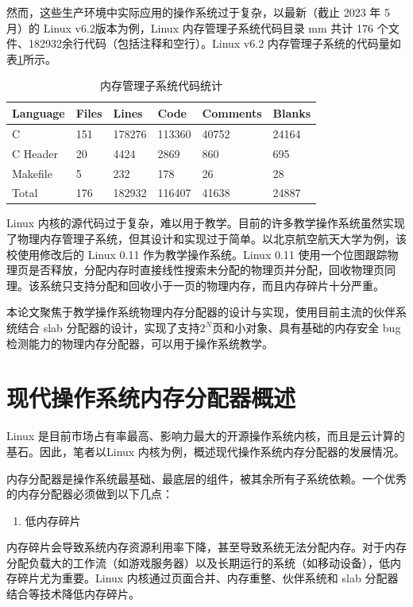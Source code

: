 \documentclass[AutoFakeBold]{LZUThesis}
\newcommand{\tightlist}{%
  \setlength{\itemsep}{0pt}\setlength{\parskip}{0pt}}
\begin{document}
\begin{sloppypar}
然而，这些生产环境中实际应用的操作系统过于复杂，以最新（截止 2023 年 5 月）的 Linux v6.2版本为例，Linux 内存管理子系统代码目录 mm 共计 176 个文件、182932余行代码（包括注释和空行）。Linux v6.2 内存管理子系统的代码量如表\ref{table:mm-code-stastic}所示。

\begin{longtable}[htb]{@{}llllll@{}}
\caption{内存管理子系统代码统计}\label{table:mm-code-stastic} \\
\toprule\noalign{}
Language & Files & Lines & Code & Comments & Blanks \\
\midrule\noalign{}
\endhead
\bottomrule\noalign{}
\endlastfoot
C & 151 & 178276 & 113360 & 40752 & 24164 \\
C Header & 20 & 4424 & 2869 & 860 & 695 \\
Makefile & 5 & 232 & 178 & 26 & 28 \\
Total & 176 & 182932 & 116407 & 41638 & 24887 \\
\end{longtable}

Linux 内核的源代码过于复杂，难以用于教学。目前的许多教学操作系统虽然实现了物理内存管理子系统，但其设计和实现过于简单。以北京航空航天大学为例，该校使用修改后的 Linux 0.11 作为教学操作系统。Linux 0.11 使用一个位图跟踪物理页是否释放，分配内存时直接线性搜索未分配的物理页并分配，回收物理页同理。该系统只支持分配和回收小于一页的物理内存，而且内存碎片十分严重。

本论文聚焦于教学操作系统物理内存分配器的设计与实现，使用目前主流的伙伴系统结合 slab 分配器的设计，实现了支持$2^N$页和小对象、具有基础的内存安全 bug 检测能力的物理内存分配器，可以用于操作系统教学。



\section{现代操作系统内存分配器概述}

Linux
是目前市场占有率最高、影响力最大的开源操作系统内核，而且是云计算的基石。因此，笔者以Linux 内核为例，概述现代操作系统内存分配器的发展情况。

内存分配器是操作系统最基础、最底层的组件，被其余所有子系统依赖。一个优秀的内存分配器必须做到以下几点：

\begin{enumerate}
\def\labelenumi{\arabic{enumi}.}
\tightlist
\item
  低内存碎片
\end{enumerate}

内存碎片会导致系统内存资源利用率下降，甚至导致系统无法分配内存。对于内存分配负载大的工作流（如游戏服务器）以及长期运行的系统（如移动设备），低内存碎片尤为重要。Linux 内核通过页面合并、内存重整、伙伴系统和 slab 分配器结合等技术降低内存碎片。


\end{sloppypar}
\end{document}
